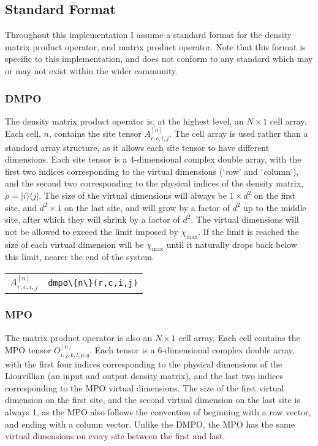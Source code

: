  \subsection{Standard Format}
 Throughout this implementation I assume a standard format for the density matrix product operator, and matrix product operator. Note that this format is specific to this implementation, and does not conform to any standard which may or may not exist within the wider community.
 \subsubsection{DMPO} 
 The density matrix product operator is, at the highest level, an \(N \times 1\) cell array. Each cell, \(n\), contains the site tensor \(A^{[n]}_{r,c,i,j}\). The cell array is used rather than a standard array structure, as it allows each site tensor to have different dimensions. Each site tensor is a 4-dimensional complex double array, with the first two indices corresponding to the virtual dimensions (`\emph{r}ow' and `\emph{c}olumn'), and the second two corresponding to the physical indices of the density matrix, \(\rho = |i \rangle \langle j|\). The size of the virtual dimensions will always be \(1 \times d^{2}\) on the first site, and \(d^{2} \times 1\) on the last site, and will grow by a factor of \(d^{2}\) up to the middle site, after which they will shrink by a factor of \(d^{2}\). The virtual dimensions will not be allowed to exceed the limit imposed by \(\chi_{\mathrm{max}}\). If the limit is reached the size of each virtual dimension will be \(\chi_{\mathrm{max}}\) until it naturally drops back below this limit, nearer the end of the system. 

 \begin{tabu} to \linewidth {X[c]|X[c]}
  	\(A^{[n]}_{r,c,i,j}\) & \lstinline$dmpo\{n\}(r,c,i,j)$
 \end{tabu}

\subsubsection{MPO}
The matrix product operator is also an \(N \times 1\) cell array. Each cell contains the MPO tensor \(O^{[n]}_{i,j,k,l,p,q}\). Each tensor is a 6-dimensional complex double array, with the first four indices corresponding to the physical dimensions of the Liouvillian (an input and output density matrix), and the last two indices corresponding to the MPO virtual dimensions. The size of the first virtual dimension on the first site, and the second virtual dimension on the last site is always 1, as the MPO also follows the convention of beginning with a row vector, and ending with a column vector. Unlike the DMPO, the MPO has the same virtual dimensions on every site between the first and last.

